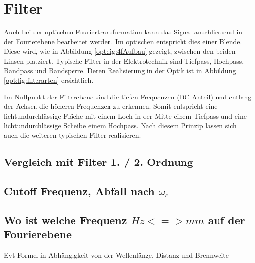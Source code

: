 %
%
%
%
\section{Filter
\label{opt:section:filter}}

Auch bei der optischen Fouriertransformation kann das Signal anschliessend in der Fourierebene bearbeitet werden.
Im optischen entspricht dies einer Blende.
Diese wird, wie in Abbildung \ref{opt:fig:4fAufbau} gezeigt, zwischen den beiden Linsen platziert.
Typische Filter in der Elektrotechnik sind Tiefpass, Hochpass, Bandpass und Bandsperre.
Deren Realisierung in der Optik ist in Abbildung \ref{opt:fig:filterarten} ersichtlich.

Im Nullpunkt der Filterebene sind die tiefen Frequenzen (DC-Anteil) und entlang der Achsen die höheren Frequenzen zu erkennen.
Somit entspricht eine lichtundurchlässige Fläche mit einem Loch in der Mitte einem Tiefpass und eine lichtundurchlässige Scheibe einem Hochpass.
Nach diesem Prinzip lassen sich auch die weiteren typischen Filter realisieren.

\subsection{Vergleich mit Filter 1. / 2. Ordnung}

\subsection{Cutoff Frequenz, Abfall nach $\omega_c$}

\subsection{Wo ist welche Frequenz $Hz <=> mm$ auf der Fourierebene}
Evt Formel in Abhängigkeit von der Wellenlänge, Distanz und Brennweite

